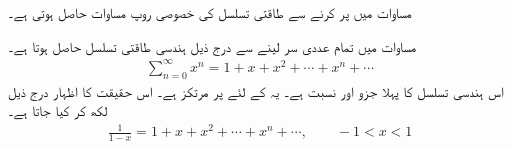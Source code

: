 مساوات  میں  پر کرنے سے طاقتی تسلسل کی خصوصی روپ مساوات  حاصل ہوتی ہے۔

مساوات  میں تمام عددی سر  لینے سے درج ذیل ہندسی طاقتی تسلسل حاصل ہوتا ہے۔
\begin{align*}
\sum_{n=0}^{\infty}x^n=1+x+x^2+\cdots+x^n+\cdots
\end{align*}
اس ہندسی تسلسل کا پہلا جزو  اور نسبت  ہے۔ یہ  کے لئے  پر مرتکز ہے۔ اس حقیقت کا اظہار درج ذیل لکھ کر کیا جاتا ہے۔
\begin{align}\label{مساوات_تسلسل_تعریف_طاقتی_پ}
\frac{1}{1-x}=1+x+x^2+\cdots+x^n+\cdots,\quad\quad -1<x<1
\end{align}


